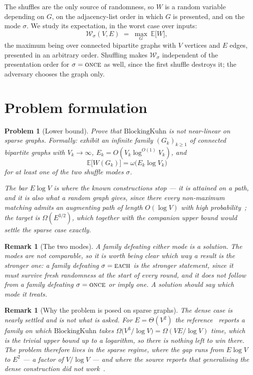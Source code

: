 \documentclass[10pt]{article}
\newtheorem{problem}{Problem}
\newtheorem{remark}[theorem]{Remark}
\newcommand{\BKuhn}{\text{BlockingKuhn}}
\newcommand{\Ex}{\mathbb{E}}
\newcommand{\ONCE}{\textup{\textsc{once}}}
\newcommand{\EACH}{\textup{\textsc{each}}}
\begin{document}
The shuffles are the only source of randomness, so $W$ is a random variable
depending on $G$, on the adjacency-list order in which $G$ is presented, and on
the mode $\sigma$. We study its expectation, in the worst case over inputs:
\[
  \mathcal{W}_\sigma(V,E)
  \;=\;
  \max_{G}\ \Ex\bigl[W\bigr],
\]
the maximum being over connected bipartite graphs with $V$ vertices and $E$
edges, presented in an arbitrary order. Shuffling makes
$\mathcal{W}_\sigma$ independent of the presentation order for
$\sigma=\ONCE$ as well, since the first shuffle destroys it; the
adversary chooses the graph only.

\section{Problem formulation}

\begin{problem}[Lower bound]\label{prob:lower}
Prove that $\BKuhn$ is not near-linear on sparse graphs. Formally: exhibit an
infinite family $(G_k)_{k\ge1}$ of connected bipartite graphs with
$V_k\to\infty$, $E_k=O(V_k\log^{O(1)}V_k)$, and
\[
  \Ex\bigl[W(G_k)\bigr]=\omega\bigl(E_k\log V_k\bigr)
\]
for at least one of the two shuffle modes $\sigma$.

The bar $E\log V$ is where the known constructions stop --- it is attained on a
path, and it is also what a random graph gives, since there every non-maximum
matching admits an augmenting path of length $O(\log V)$ with high
probability~\cite{BMST06}; the target is $\Omega(E^{3/2})$, which together with
the companion upper bound would settle the sparse case exactly.
\end{problem}

\begin{remark}[The two modes]\label{rem:modes}
A family defeating either mode is a solution. The modes are not comparable, so
it is worth being clear which way a result is the stronger one: a family
defeating $\sigma=\EACH$ is the stronger statement, since it must survive fresh
randomness at the start of every round, and it does not follow from a family
defeating $\sigma=\ONCE$ or imply one. A solution should say which mode it
treats.
\end{remark}

\begin{remark}[Why the problem is posed on sparse graphs]\label{rem:dense}
The dense case is nearly settled and is not what is asked.
For $E=\Theta(V^{2})$ the reference~\cite{Kaban19} reports a family on which
$\BKuhn$ takes $\Omega\bigl(V^{3}/\log V\bigr)=\Omega(VE/\log V)$ time, which is
the trivial upper bound up to a logarithm, so there is nothing left to win
there. The problem therefore lives in the sparse regime, where the gap runs from
$E\log V$ to $E^{2}$ --- a factor of $V/\log V$ --- and where the source reports
that generalising the dense construction did not work~\cite{Kaban19}.
\end{remark}
\end{document}
